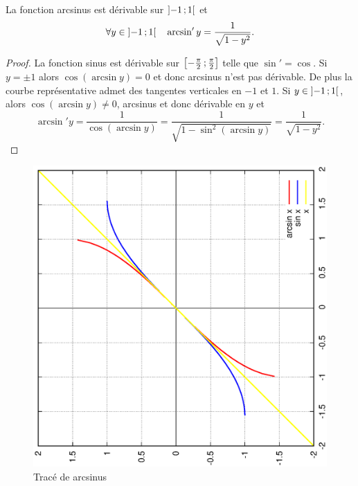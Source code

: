 %
\begin{prop}
  La fonction arcsinus est dérivable sur $\left] -1 \, ;  1 \right[$ et
  \begin{equation}
    \forall y \in \left] -1 \, ;  1 \right[ \quad \arcsin'y = \frac{1}{\sqrt{1-y^2}}.
  \end{equation}
\end{prop}
\begin{proof}
  La fonction sinus est dérivable sur $\left[ -\frac{\pi}{2} \, ;  \frac{\pi}{2} \right]$ telle que $\sin'=\cos$. Si $y=\pm 1$ alors $\cos(\arcsin y)=0$ et donc arcsinus n'est pas dérivable. De plus la courbe représentative admet des tangentes verticales en $-1$ et $1$. Si $y \in \left] -1 \, ;  1 \right[$, alors $\cos(\arcsin y) \neq 0$, arcsinus et donc dérivable en $y$ et
  \begin{equation}
    \arcsin' y = \frac{1}{\cos( \arcsin y)}=\frac{1}{\sqrt{1-\sin^2(\arcsin y)}}=\frac{1}{\sqrt{1-y^2}}.
  \end{equation}
\end{proof}
\begin{figure}
  \centering
  \includegraphics[scale=0.4,angle=-90]{arcsin.ps}
  \caption{Tracé de arcsinus}
  \label{fig:tracearcsinus}
\end{figure}
%
